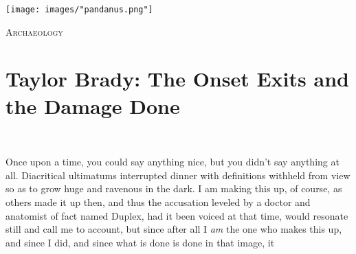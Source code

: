 \documentclass[
]{memoir}
\begin{document}
\begin{center}\texttt{[image: images/"pandanus.png"]}\end{center}

\lettrine[lines=3, findent=0em, nindent=0.1em, lhang=0]{A}{rchaeology}

\hypertarget{taylor-brady-the-onset-exits-and-the-damage-done}{%
\chapter{Taylor Brady: The Onset Exits and the Damage
Done}\label{taylor-brady-the-onset-exits-and-the-damage-done}}

~

Once upon a time, you could say anything nice, but you didn't say
anything at all. Diacritical ultimatums interrupted dinner with
definitions withheld from view so as to grow huge and ravenous in the
dark. I am making this up, of course, as others made it up then, and
thus the accusation leveled by a doctor and anatomist of fact named
Duplex, had it been voiced at that time, would resonate still and call
me to account, but since after all I \emph{am} the one who makes this
up, and since I did, and since what is done is done in that image, it
\end{document}
